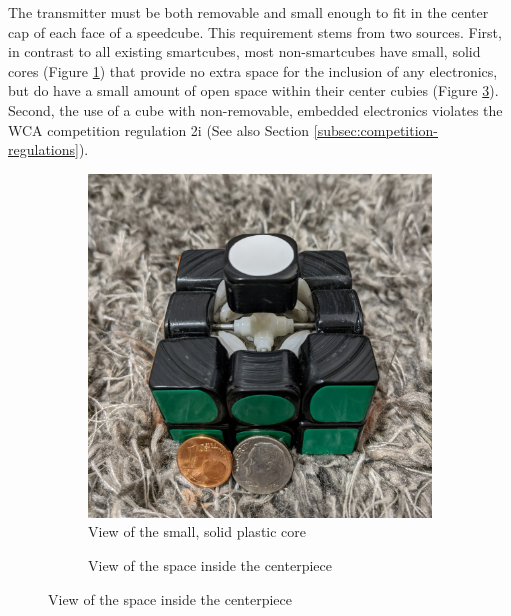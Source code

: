 The transmitter must be both removable and small enough to fit in the
center cap of each face of a speedcube. This requirement stems from two
sources. First, in contrast to all existing smartcubes, most
non-smartcubes have small, solid cores (Figure
\ref{fig:356-core-closed}) that provide no extra space for the
inclusion of any electronics, but do have a small amount of open space
within their center cubies (Figure \ref{fig:356-core-open}). Second,
the use of a cube with non-removable, embedded electronics violates the
WCA competition regulation 2i \cite{wca-regulations} (See also Section
\ref{subsec:competition-regulations}).

\begin{figure}[h]
    \centering
    \caption{Internal pieces of a standard speedcube (Gans 356)}
    \label{fig:356-core}
    \begin{subfigure}{.45\textwidth}
        \centering
        \caption{View of the small, solid plastic core}
        \label{fig:356-core-closed}
        \includegraphics[width=\linewidth]{Figures/6 PCB Design/356_core_cropped.jpg}
    \end{subfigure}
    \begin{subfigure}{.45\textwidth}
        \centering
        \caption{View of the space inside the centerpiece}
        \label{fig:356-core-open}

\end{subfigure}
\end{figure}
